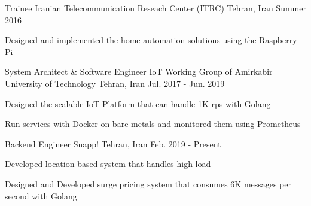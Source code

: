 

\begin{cventries}

  \cventry
    {Trainee} %
    {Iranian Telecommunication Reseach Center (ITRC)} %
    {Tehran, Iran} %
    {Summer 2016} %
    {
      \begin{cvitems} %
        \item {Designed and implemented the home automation solutions using the Raspberry Pi}
      \end{cvitems}
    }


  \cventry
    {System Architect \& Software Engineer} %
    {IoT Working Group of Amirkabir University of Technology} %
    {Tehran, Iran} %
    {Jul. 2017 - Jun. 2019} %
    {
      \begin{cvitems} %
        \item {Designed the scalable IoT Platform that can handle 1K rps with Golang}
        \item {Run services with Docker on bare-metals and monitored them using Prometheus}
      \end{cvitems}
    }


  \cventry
    {Backend Engineer} %
    {Snapp!} %
    {Tehran, Iran} %
    {Feb. 2019 - Present} %
    {
      \begin{cvitems} %
        \item {Developed location based system that handles high load}
        \item {Designed and Developed surge pricing system that consumes 6K messages per second with Golang}
      \end{cvitems}
    }

\end{cventries}
